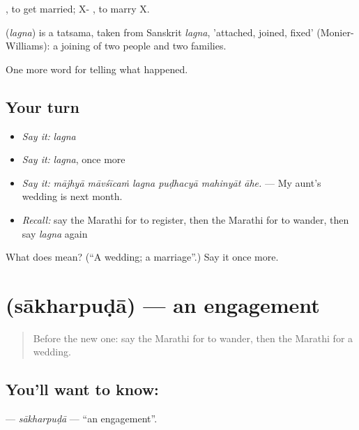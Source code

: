  , to get married; X-  , to marry X.

\begin{cousinweb}
\textbf{} (\emph{lagna}) is a tatsama, taken from Sanskrit \emph{lagna}, 'attached, joined, fixed' (Monier-Williams): a joining of two people and two families.
\end{cousinweb}

\begin{grammarlens}[title={What you've built}]
One more word for telling what happened.
\end{grammarlens}

\subsection*{Your turn}
\begin{itemize}
\raggedright
  \item \emph{Say it:} \emph{lagna}
  \item \emph{Say it:} \emph{lagna}, once more
  \item \emph{Say it:} \emph{mājhyā māvśīcaṁ lagna puḍhacyā mahinyāt āhe.} — My aunt's wedding is next month.
  \item \emph{Recall:} say the Marathi for to register, then the Marathi for to wander, then say \emph{lagna} again
\end{itemize}

\begin{tcolorbox}[breakable,colback=teal!4,colframe=teal!35!black,title={Before you move on}]
What does  mean? (\textquotedblleft{}A wedding; a marriage\textquotedblright{}.) Say it once more.
\end{tcolorbox}
\section[\texorpdfstring{\mr{साखरपुडा} (sākharpuḍā)}{साखरपुडा (sākharpuḍā)}]{ (sākharpuḍā) — an engagement}

\label{lesson:MR-C316-sakharpuda}



\begin{quote}
Before the new one: say the Marathi for to wander, then the Marathi for a wedding.
\end{quote}

\subsection*{You'll want to know: }
\textbf{} — \emph{sākharpuḍā} — \textquotedblleft{}an engagement\textquotedblright{}.

